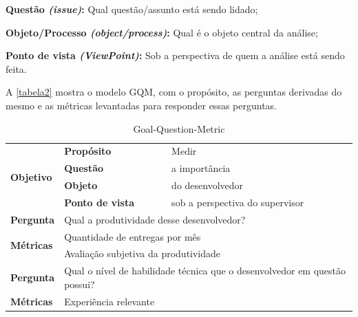 \begin{alineas}
	\item \textbf{Questão \textit{(issue)}:} Qual questão/assunto está sendo lidado;
	\item \textbf{Objeto/Processo \textit{(object/process)}:} Qual é o objeto central da análise;
	\item \textbf{Ponto de vista \textit{(ViewPoint)}:} Sob a perspectiva de quem a análise está sendo feita.
\end{alineas}
	
A \autoref{tabela2} mostra o modelo GQM, com o propósito, as perguntas derivadas do mesmo e as métricas levantadas para responder essas perguntas.


\begin{table}[h]
	\footnotesize
	\caption{Goal-Question-Metric}
	\label{tabela2}
	\def\arraystretch{1.5}
	\begin{tabular}{|p{2cm}|p{6.25cm}|p{6.25cm}|}
		\hline
		\multirow{4}{*}{\textbf{Objetivo}} & \textbf{Propósito}                              & Medir                                                 \\ \cline{2-3} 
		& \textbf{Questão}                                & a importância                                         \\ \cline{2-3} 
		& \textbf{Objeto}                                 & do desenvolvedor                                      \\ \cline{2-3} 
		& \textbf{Ponto de vista}                         & sob a perspectiva do supervisor                       \\ \hline
		\textbf{Pergunta}                  & \multicolumn{2}{l|}{Qual a produtividade desse desenvolvedor?}                                          \\ \hline\hline
		\multirow{2}{*}{\textbf{Métricas}} & \multicolumn{2}{l|}{Quantidade de entregas por mês}                                                     \\ \cline{2-3} 
		& \multicolumn{2}{l|}{Avaliação subjetiva da produtividade}                                               \\ \hline\hline
		\textbf{Pergunta}                  & \multicolumn{2}{l|}{\parbox{12cm}{ Qual o nível de habilidade técnica que o desenvolvedor em questão possui?}}          \\ \hline
		\multirow{4}{*}{\textbf{Métricas}} & \multicolumn{2}{l|}{Experiência relevante}                                                              \\ \cline{2-3} 

\end{tabular}
\end{table}
